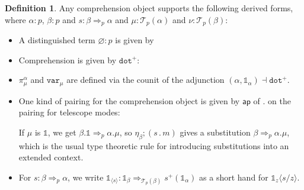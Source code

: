 \documentclass[10pt]{article}
\theoremstyle{definition}
\newtheorem{definition}{Definition}
\let\emptyset\varnothing
\newcommand\dsd[1]{\ensuremath{\mathsf{#1}}}
\newcommand{\yields}{\vdash}
\newcommand{\tcell}{\Rightarrow}
\newcommand{\app}[2]{\ensuremath{#1 \: #2}}
\newcommand{\fst}[1]{\app{\dsd{fst}}{#1}}
\newcommand{\snd}[1]{\app{\dsd{snd}}{#1}}
\newcommand\TermTwoT[5]{\ensuremath{#1 \vdash {#2} : #3 \tcell_{#5} #4}}
\newcommand\TrPlus[2]{\ensuremath{{#1}^+(#2)}}
\newcommand\El[2]{\mathcal{T}_{#1}(#2)}
\newcommand\ApEl[2]{\mathcal{T}_{#1}\langle#2\rangle}
\newcommand\bdot[0]{\mathbin{.}}
\newcommand\ap[2]{\ensuremath{#1 \langle #2 \rangle }}
\newcommand\ApPlus[2]{\ensuremath{{#1}^+ \langle #2 \rangle }}
\newcommand{\tdot}{\ensuremath{\mathtt{dot}}}
\newcommand{\tempty}{\ensuremath{\mathtt{empty}}}
\newcommand\One{\ensuremath{\mathds{1}}}
\newcommand\var[1]{\ensuremath{\mathtt{var}_{#1}}}
\newcommand\ApOne[1]{\ensuremath{\One_{\langle {#1} \rangle }}}
\begin{document}
\begin{definition}
Any comprehension object supports the following derived forms, where
$\alpha : p$, $\beta : p$ and
${s} : {\beta} \tcell_p {\alpha}$ and
$\mu : \El{p}{\alpha}$ and $\nu : \El{p}{\beta}$:
  \begin{itemize}
  \item A distinguished term $\emptyset : p$ is given by
  \item Comprehension is given by $\tdot^+$:
  \item $\pi^\alpha_\mu$ and $\var{\mu}$ are defined via the counit of the adjunction $(\alpha,\One_\alpha) \dashv \tdot^+$.

  \item One kind of pairing for the comprehension object is given by $\mathsf{ap}$ of
  $.$ on the pairing for telescope modes:

  If $\mu$ is $\One$, we get ${\beta.\One} \tcell_p
  {\alpha.\mu}$, so $\eta_\beta;(s \bdot m)$ gives
  a substitution ${\beta} \tcell_p {\alpha.\mu}$, which is the usual
  type theoretic rule for introducing substitutions into an extended
  context.

  \item For $s : \beta \tcell_p \alpha$, we write $\ApOne{s} :
    \One_{\beta} \tcell_{\El p \beta} \TrPlus{s}{\One_\alpha}$ as a
    short hand for $\ap{\One_z}{s/z}$.  
  \end{itemize}
\end{definition}
\end{document}
